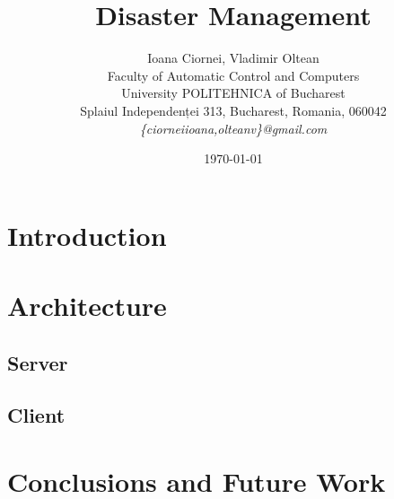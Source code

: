 \documentclass[12pt]{article}
\title{Disaster Management}
\author{Ioana Ciornei, Vladimir Oltean\\
Faculty of Automatic Control and Computers\\
University POLITEHNICA of Bucharest\\
Splaiul Independenței 313, Bucharest, Romania, 060042 \\
\emph{\{ciorneiioana,olteanv\}@gmail.com}}
\date{\today}
\begin{document}
\maketitle

\begin{abstract}

\end{abstract}

\section{Introduction}
\label{sec:introduction}


\section{Architecture}
\label{sec:architecture}

\subsection{Server}
\label{sec:server}


\subsection{Client}
\label{sec:client}


\section{Conclusions and Future Work}
\label{sec:conclusions}




\end{document}
